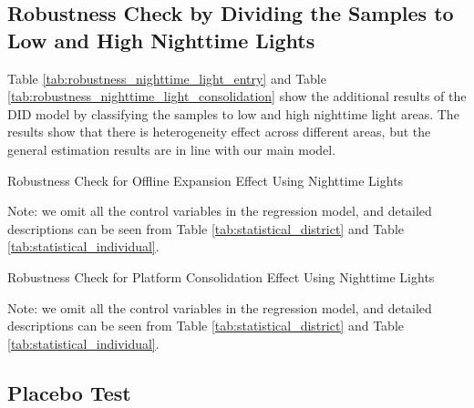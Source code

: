 \documentclass[11pt]{article}
\begin{document}
\newpage


\subsection{Robustness Check by Dividing the Samples to Low and High Nighttime Lights} \label{subsec:nighttime_light_robustness_check}


Table \ref{tab:robustness_nighttime_light_entry} and Table \ref{tab:robustness_nighttime_light_consolidation} show the additional results of the DID model by classifying the samples to low and high nighttime light areas. The results show that there is heterogeneity effect across different areas, but the general estimation results are in line with our main model.

\begin{table}[H]
  \begin{center}
    \begin{scriptsize}
      \caption{Robustness Check for Offline Expansion Effect Using Nighttime Lights}
      \label{tab:robustness_nighttime_light_entry}
      
    
    Note: we omit all the control variables in the regression model, and detailed descriptions can be seen from Table \ref{tab:statistical_district} and Table \ref{tab:statistical_individual}.
    \end{scriptsize}
  \end{center}
\end{table}

\begin{table}[H]
  \begin{center}
    \begin{scriptsize}
      \caption{Robustness Check for Platform Consolidation Effect Using Nighttime Lights}
      \label{tab:robustness_nighttime_light_consolidation}
      
    
    Note: we omit all the control variables in the regression model, and detailed descriptions can be seen from Table \ref{tab:statistical_district} and Table \ref{tab:statistical_individual}.
    \end{scriptsize}
  \end{center}
\end{table}

\subsection{Placebo Test} \label{subsec:placebo_test}
\end{document}
